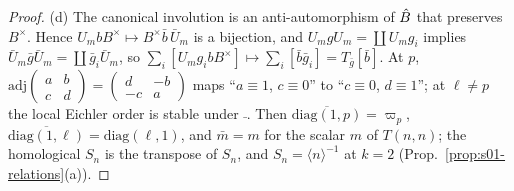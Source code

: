 \begin{proof}
(d) The canonical involution is an anti-automorphism of $\hat{B}$ that preserves $B^\times$. Hence $U_mbB^\times\mapsto B^\times\bar b\,\bar U_m$ is a bijection,
and $U_mgU_m=\coprod U_mg_i$ implies $\bar U_m\bar g\bar U_m=\coprod\bar g_i\bar U_m$, so $\sum_i[U_mg_ibB^\times]\mapsto\sum_i[\bar b\bar g_i]=T_{\bar g}[\bar b]$. At $p$,
$\mathrm{adj}\left(\begin{smallmatrix}a&b\\c&d\end{smallmatrix}\right)=\left(\begin{smallmatrix}d&-b\\-c&a\end{smallmatrix}\right)$ maps ``$a\equiv1$, $c\equiv0$'' to ``$c\equiv0$, $d\equiv1$''; at $\ell\ne p$ the local
Eichler order is stable under $\bar{\ }$. Then $\overline{\mathrm{diag}(1,p)}=\varpi_p$, $\overline{\mathrm{diag}(1,\ell)}=\mathrm{diag}(\ell,1)$, and $\bar m=m$ for the scalar
$m$ of $T(n,n)$; the homological $S_n$ is the transpose of $S_n$, and $S_n=\langle n\rangle^{-1}$ at $k=2$ (Prop.~\ref{prop:s01-relations}(a)).
\end{proof}

